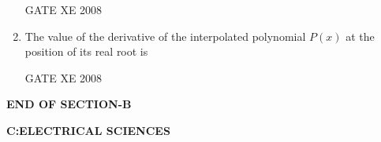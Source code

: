 \documentclass[12pt]{article}
\begin{document}
\begin{enumerate}[label=Q\arabic*.]
GATE XE 2008
\item The value of the derivative of the interpolated polynomial $P(x)$ at the position of its real root is

\begin{enumerate}[label=(\Alph*)]
\end{enumerate}

GATE XE 2008







\end{enumerate}
    


\begin{center}
    \textbf{END OF SECTION-B}
\end{center}

\newpage
\begin{center}
    \textbf{C:ELECTRICAL SCIENCES}
\end{center}
\end{document}
